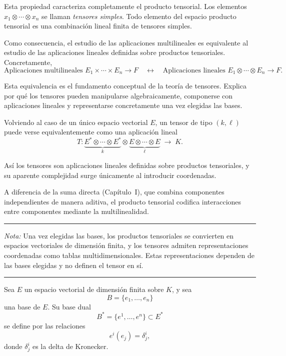 Esta propiedad caracteriza completamente el producto tensorial.
Los elementos \(x_1 \otimes \cdots \otimes x_n\) se llaman \emph{tensores simples}.
Todo elemento del espacio producto tensorial es una combinación lineal finita
de tensores simples.

\medskip

Como consecuencia, el estudio de las aplicaciones multilineales es equivalente
al estudio de las aplicaciones lineales definidas sobre productos tensoriales.
Concretamente,
\[
\text{Aplicaciones multilineales } E_1 \times \cdots \times E_n \to F
\quad\longleftrightarrow\quad
\text{Aplicaciones lineales } E_1 \otimes \cdots \otimes E_n \to F.
\]

\medskip

Esta equivalencia es el fundamento conceptual de la teoría de tensores.
Explica por qué los tensores pueden manipularse algebraicamente, componerse
con aplicaciones lineales y representarse concretamente una vez elegidas las bases.

\medskip

Volviendo al caso de un único espacio vectorial \(E\), un tensor de tipo
\((k,\ell)\) puede verse equivalentemente como una aplicación lineal
\[
T :
\underbrace{E^* \otimes \cdots \otimes E^*}_{k}
\otimes
\underbrace{E \otimes \cdots \otimes E}_{\ell}
\;\longrightarrow\; K.
\]

\medskip

Así los tensores son aplicaciones lineales definidas sobre productos tensoriales,
y su aparente complejidad surge únicamente al introducir coordenadas.

\medskip

A diferencia de la suma directa (Capítulo~I), que combina componentes
independientes de manera aditiva, el producto tensorial codifica interacciones
entre componentes mediante la multilinealidad.

\bigskip
\hrule
\medskip

\textit{Nota:} Una vez elegidas las bases, los productos tensoriales se
convierten en espacios vectoriales de dimensión finita, y los tensores admiten
representaciones coordenadas como tablas multidimensionales. Estas
representaciones dependen de las bases elegidas y no definen el tensor en sí.

\medskip
\hrule
\bigskip

Sea $E$ un espacio vectorial de dimensión finita sobre $K$, y sea
\[
B = \{ e_1, \dots, e_n \}
\]
una base de $E$. Su base dual
\[
B^* = \{ e^1, \dots, e^n \}
\subset E^*
\]
se define por las relaciones
\[
e^i(e_j) = \delta^i_j,
\]
donde $\delta^i_j$ es la delta de Kronecker.

